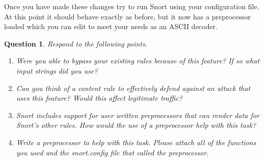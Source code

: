 \documentclass[a4paper,11pt,hidelinks]{article}
\newtheorem{theorem}{Question}[subsection]
\begin{document}
Once you have made these changes try to run Snort using your configuration file. At this point it should behave exactly as before, but it now has a preprocessor loaded which you can edit to meet your needs as an ASCII decoder.

\begin{theorem}
    Respond to the following points.
    \begin{enumerate}
        \item Were you able to bypass your existing rules because of this feature? If so what input strings did you use?
        \item Can you think of a content rule to effectively defend against an attack that uses this feature? Would this affect legitimate traffic?
        \item Snort includes support for user written preprocessors that can render data for Snort's other rules. How would the use of a preprocessor help with this task?
        \item Write a preprocessor to help with this task. Please attach all of the functions you used and the snort.config file that called the preprocessor.
    \end{enumerate}
\end{theorem}

\endgroup
\end{document}
